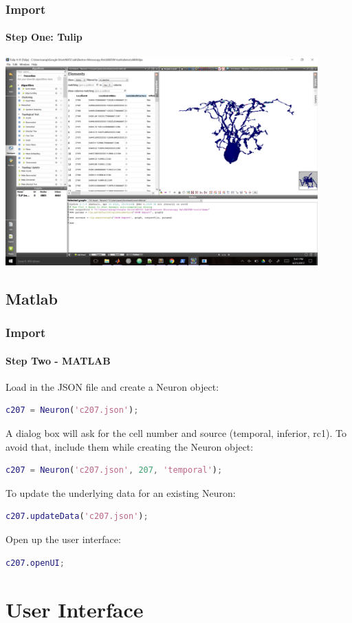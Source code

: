 \documentclass[11pt]{beamer}
\begin{document}
\begin{frame}
	\frametitle{Import}
	\framesubtitle{Step One: Tulip}
	\includegraphics[width = 0.9\textwidth]{tulip_python}
\end{frame}
\subsection{Matlab}
\begin{frame}[fragile]
	\frametitle{Import}
	\framesubtitle{Step Two - MATLAB}
	Load in the JSON file and create a Neuron object:
	\begin{lstlisting}[language=matlab]
c207 = Neuron('c207.json');\end{lstlisting}
	A dialog box will ask for the cell number and source (temporal, inferior, rc1). To avoid that, include them while creating the Neuron object:
	\begin{lstlisting}[language=matlab]
% output = Neuron(filename, cellNumber, source);
c207 = Neuron('c207.json', 207, 'temporal');\end{lstlisting}
	To update the underlying data for an existing Neuron:
	\begin{lstlisting}[language=matlab]
c207.updateData('c207.json');\end{lstlisting}
	Open up the user interface:
	\begin{lstlisting}[language=matlab]
c207.openUI;\end{lstlisting}
\end{frame}
\section{User Interface}
\end{document}
